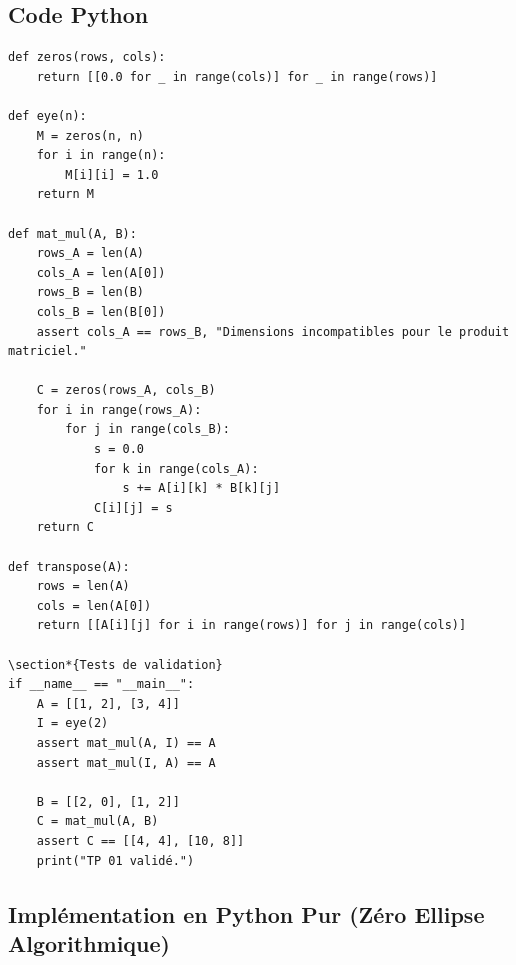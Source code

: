 \documentclass{report}
\begin{document}
\subsection*{Code Python}
\begin{verbatim}
def zeros(rows, cols):
    return [[0.0 for _ in range(cols)] for _ in range(rows)]

def eye(n):
    M = zeros(n, n)
    for i in range(n):
        M[i][i] = 1.0
    return M

def mat_mul(A, B):
    rows_A = len(A)
    cols_A = len(A[0])
    rows_B = len(B)
    cols_B = len(B[0])
    assert cols_A == rows_B, "Dimensions incompatibles pour le produit matriciel."

    C = zeros(rows_A, cols_B)
    for i in range(rows_A):
        for j in range(cols_B):
            s = 0.0
            for k in range(cols_A):
                s += A[i][k] * B[k][j]
            C[i][j] = s
    return C

def transpose(A):
    rows = len(A)
    cols = len(A[0])
    return [[A[i][j] for i in range(rows)] for j in range(cols)]

\section*{Tests de validation}
if __name__ == "__main__":
    A = [[1, 2], [3, 4]]
    I = eye(2)
    assert mat_mul(A, I) == A
    assert mat_mul(I, A) == A

    B = [[2, 0], [1, 2]]
    C = mat_mul(A, B)
    assert C == [[4, 4], [10, 8]]
    print("TP 01 validé.")
\end{verbatim}






\subsection*{Implémentation en Python Pur (Zéro Ellipse Algorithmique)}
\end{document}
